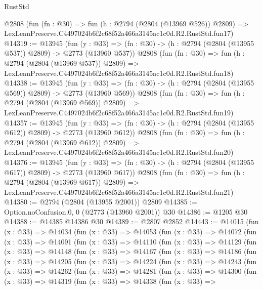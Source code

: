 \begin{lexlean}{RustStd}
\begin{coremodule}
    @2808
    (fun (fn : @30) =>
    fun (h : @2794 (@2804 (@13969 @526)) @2809) =>
    LexLeanPreserve.C4497024b6f2c68f52a466a3145ac1c0d.R2.RustStd.fun17)
@14319 := @13945
    (fun (y : @33) => (fn : @30) -> (h : @2794 (@2804 (@13955 @537)) @2809) -> @2773 (@13960 @537))
    @2808
    (fun (fn : @30) =>
    fun (h : @2794 (@2804 (@13969 @537)) @2809) =>
    LexLeanPreserve.C4497024b6f2c68f52a466a3145ac1c0d.R2.RustStd.fun18)
@14338 := @13945
    (fun (y : @33) => (fn : @30) -> (h : @2794 (@2804 (@13955 @569)) @2809) -> @2773 (@13960 @569))
    @2808
    (fun (fn : @30) =>
    fun (h : @2794 (@2804 (@13969 @569)) @2809) =>
    LexLeanPreserve.C4497024b6f2c68f52a466a3145ac1c0d.R2.RustStd.fun19)
@14357 := @13945
    (fun (y : @33) => (fn : @30) -> (h : @2794 (@2804 (@13955 @612)) @2809) -> @2773 (@13960 @612))
    @2808
    (fun (fn : @30) =>
    fun (h : @2794 (@2804 (@13969 @612)) @2809) =>
    LexLeanPreserve.C4497024b6f2c68f52a466a3145ac1c0d.R2.RustStd.fun20)
@14376 := @13945
    (fun (y : @33) => (fn : @30) -> (h : @2794 (@2804 (@13955 @617)) @2809) -> @2773 (@13960 @617))
    @2808
    (fun (fn : @30) =>
    fun (h : @2794 (@2804 (@13969 @617)) @2809) =>
    LexLeanPreserve.C4497024b6f2c68f52a466a3145ac1c0d.R2.RustStd.fun21)
@14380 := @2794 (@2804 (@13955 @2001)) @2809
@14385 := Option.noConfusion.{0, 0} (@2773 (@13960 @2001)) @30
@14386 := @1205 @30
@14388 := @14385 @14386 @30
@14389 := @2807 @2852
@14443 := @14015
    (fun (x : @33) =>
    @14034
      (fun (x : @33) =>
      @14053
        (fun (x : @33) =>
        @14072
          (fun (x : @33) =>
          @14091
            (fun (x : @33) =>
            @14110
              (fun (x : @33) =>
              @14129
                (fun (x : @33) =>
                @14148
                  (fun (x : @33) =>
                  @14167
                    (fun (x : @33) =>
                    @14186
                      (fun (x : @33) =>
                      @14205
                        (fun (x : @33) =>
                        @14224
                          (fun (x : @33) =>
                          @14243
                            (fun (x : @33) =>
                            @14262
                              (fun (x : @33) =>
                              @14281
                                (fun (x : @33) =>
                                @14300
                                  (fun (x : @33) =>
                                  @14319
                                    (fun (x : @33) =>
                                    @14338
                                      (fun (x : @33) =>

\end{coremodule}
\end{lexlean}
